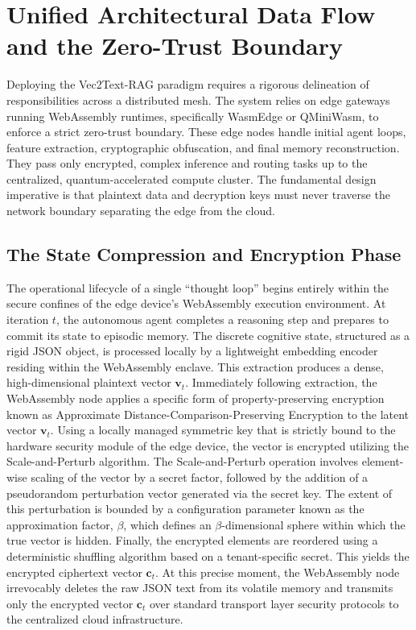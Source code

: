 \documentclass[12pt]{article}
\begin{document}
\section{Unified Architectural Data Flow and the Zero-Trust Boundary}

Deploying the Vec2Text-RAG paradigm requires a rigorous delineation of responsibilities across a distributed mesh. The system relies on edge gateways running WebAssembly runtimes, specifically WasmEdge or QMiniWasm, to enforce a strict zero-trust boundary. These edge nodes handle initial agent loops, feature extraction, cryptographic obfuscation, and final memory reconstruction. They pass only encrypted, complex inference and routing tasks up to the centralized, quantum-accelerated compute cluster. The fundamental design imperative is that plaintext data and decryption keys must never traverse the network boundary separating the edge from the cloud.

\subsection{The State Compression and Encryption Phase}

The operational lifecycle of a single ``thought loop'' begins entirely within the secure confines of the edge device's WebAssembly execution environment. At iteration $t$, the autonomous agent completes a reasoning step and prepares to commit its state to episodic memory. The discrete cognitive state, structured as a rigid JSON object, is processed locally by a lightweight embedding encoder residing within the WebAssembly enclave. This extraction produces a dense, high-dimensional plaintext vector $\mathbf{v}_t$. Immediately following extraction, the WebAssembly node applies a specific form of property-preserving encryption known as Approximate Distance-Comparison-Preserving Encryption to the latent vector $\mathbf{v}_t$. Using a locally managed symmetric key that is strictly bound to the hardware security module of the edge device, the vector is encrypted utilizing the Scale-and-Perturb algorithm. The Scale-and-Perturb operation involves element-wise scaling of the vector by a secret factor, followed by the addition of a pseudorandom perturbation vector generated via the secret key. The extent of this perturbation is bounded by a configuration parameter known as the approximation factor, $\beta$, which defines an $\beta$-dimensional sphere within which the true vector is hidden. Finally, the encrypted elements are reordered using a deterministic shuffling algorithm based on a tenant-specific secret. This yields the encrypted ciphertext vector $\mathbf{c}_t$. At this precise moment, the WebAssembly node irrevocably deletes the raw JSON text from its volatile memory and transmits only the encrypted vector $\mathbf{c}_t$ over standard transport layer security protocols to the centralized cloud infrastructure.
\end{document}

